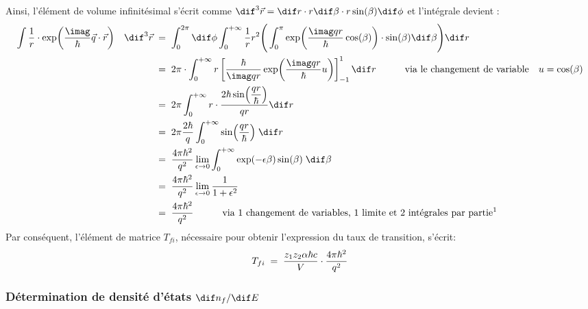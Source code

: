 Ainsi, l'élément de volume infinitésimal s'écrit comme  $\dif^3\vec{r} = \dif r \cdot r \dif\beta \cdot r \sin(\beta) \dif\phi $ et l'intégrale devient :
\begin{align*}
    \int \dfrac{1}{r} \cdot \exp(\dfrac{\imag}{\hbar}\vec{q}\cdot\vec{r})
    \quad \dif^3\vec{r}
        &\eq
    \int_{0}^{2 \pi} \dif\phi
    \int_{0}^{+\infty} \dfrac{1}{r}r^2 
    \Bigg( 
        \int_{0}^{\pi}
        \exp(\dfrac{\imag qr}{\hbar}\cos(\beta)) \cdot \sin(\beta) \dif\beta
    \Bigg) \dif r\\
        &\eq
    2 \pi \cdot \int_{0}^{+\infty} r 
    \left[
      \dfrac{\hbar}{\imag qr}\exp(\dfrac{\imag qr}{\hbar}u)
    \right]^{1}_{-1}
    \dif r 
    \qquad \quad \text{via le changement de variable} \quad u = \cos(\beta)\\
        &\eq
    2 \pi \int_{0}^{+\infty} r
    \cdot \dfrac{2\hbar \sin(\dfrac{qr}{\hbar})}{qr} \dif r\\
        &\eq
    2 \pi \dfrac{2\hbar}{q} \int_{0}^{+\infty} \sin(\dfrac{qr}{\hbar}) \; \dif r\\
        &\eq
    \dfrac{4\pi\hbar^2}{q^2} \lim_{\epsilon \rightarrow 0}\int_{0}^{+\infty}\exp(-\epsilon \beta) \sin(\beta) \; \dif\beta\\
        &\eq
    \dfrac{4\pi\hbar^2}{q^2} \lim_{\epsilon \rightarrow 0}\dfrac{1}{1 + \epsilon^2}\\
        &\eq
    \dfrac{4\pi\hbar^2}{q^2}
    \qquad \quad \text{via 1 changement de variables, 1 limite et 2 intégrales par partie\footnotemark} 
\end{align*}
Par conséquent, l'élément de matrice $T_{fi}$, nécessaire pour obtenir l'expression du taux de transition, s'écrit:
\[
    T_{fi} 
    \; = \; 
    \dfrac{z_1 z_2\alpha\hbar c}{V} \cdot \dfrac{4 \pi \hbar^2}{q^2}
\]



\subsubsection{Détermination de densité d'états $\dif n_f/\dif E$}


